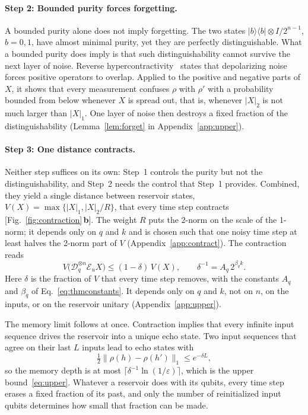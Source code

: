 \documentclass[aps,pra,reprint,superscriptaddress,floatfix]{revtex4-2}
\theoremstyle{plain}
\newcommand{\ketbra}[2]{|#1\rangle\!\langle #2|}
\newcommand{\nrm}[2]{\lvert #1\rvert_{#2}}
\newcommand{\Norm}[1]{\lVert #1\rVert}
\newcommand{\cD}{\mathcal D}
\newcommand{\cE}{\mathcal E}
\newcommand{\pnl}[1]{\textsf{\textbf{#1}}}
\begin{document}
\paragraph*{Step 2: Bounded purity forces forgetting.}
A bounded purity alone does not imply forgetting. The two states $\ketbra bb\otimes I/2^{n-1}$, $b=0,1$, have almost minimal purity, yet they are perfectly distinguishable. What a bounded purity does imply is that such distinguishability cannot survive the next layer of noise. Reverse hypercontractivity~\cite{Cubitt2015} states that depolarizing noise forces positive operators to overlap. Applied to the positive and negative parts of $X$, it shows that every measurement confuses $\rho$ with $\rho'$ with a probability bounded from below whenever $X$ is spread out, that is, whenever $\nrm X2$ is not much larger than $\nrm X1$. One layer of noise then destroys a fixed fraction of the distinguishability (Lemma~\ref{lem:forget} in Appendix~\ref{app:upper}).

\paragraph*{Step 3: One distance contracts.}
Neither step suffices on its own: Step~1 controls the purity but not the distinguishability, and Step~2 needs the control that Step~1 provides. Combined, they yield a single distance between reservoir states, $V(X)=\max\{\nrm X1,\nrm X2/R\}$, that every time step contracts [Fig.~\ref{fig:contraction}\,\pnl{b}]. The weight $R$ puts the 2-norm on the scale of the 1-norm; it depends only on $q$ and $k$ and is chosen such that one noisy time step at least halves the 2-norm part of $V$ (Appendix~\ref{app:contract}). The contraction reads
\begin{equation}
V\bigl(\cD_q^{\otimes n}\cE_uX\bigr)\le(1-\delta)\,V(X),\qquad\delta^{-1}=A_q\,2^{\beta_qk}.
\label{eq:contraction}
\end{equation}
Here $\delta$ is the fraction of $V$ that every time step removes, with the constants $A_q$ and $\beta_q$ of Eq.~\eqref{eq:thmconstants}. It depends only on $q$ and $k$, not on $n$, on the inputs, or on the reservoir unitary (Appendix~\ref{app:upper}).

The memory limit follows at once. Contraction implies that every infinite input sequence drives the reservoir into a unique echo state. Two input sequences that agree on their last $L$ inputs lead to echo states with
\begin{equation}
\tfrac12\Norm{\rho(h)-\rho(h')}_1\le e^{-\delta L},
\label{eq:forget}
\end{equation}
so the memory depth is at most $\lceil\delta^{-1}\ln(1/\varepsilon)\rceil$, which is the upper bound~\eqref{eq:upper}. Whatever a reservoir does with its qubits, every time step erases a fixed fraction of its past, and only the number of reinitialized input qubits determines how small that fraction can be made.
\end{document}
